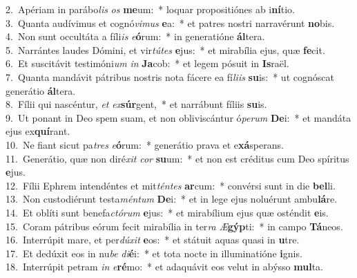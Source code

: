 {2.~}Apériam in parábo\textit{lis} \textit{os} \textbf{me}um:~* loquar propositiónes ab i\textbf{ní}tio.\\
{3.~}Quanta audívimus et cognó\textit{vi}\textit{mus} \textbf{e}a:~* et patres nostri narravérunt \textbf{no}bis.\\
{4.~}Non sunt occultáta a fíli\textit{is} \textit{e}\textbf{ó}rum:~* in generatióne \textbf{ál}tera.\\
{5.~}Narrántes laudes Dómini, et vir\textit{tú}\textit{tes} \textbf{e}jus:~* et mirabília ejus, quæ \textbf{fe}cit.\\
{6.~}Et suscitávit testimóni\textit{um} \textit{in} \textbf{Ja}cob:~* et legem pósuit in \textbf{Is}raël.\\
{7.~}Quanta mandávit pátribus nostris nota fácere ea fí\textit{li}\textit{is} \textbf{su}is:~* ut cognóscat generátio \textbf{ál}tera.\\
{8.~}Fílii qui nascéntur, \textit{et} \textit{ex}\textbf{súr}gent,~* et narrábunt fíliis \textbf{su}is.\\
{9.~}Ut ponant in Deo spem suam, et non obliviscántur ó\textit{pe}\textit{rum} \textbf{De}i:~* et mandáta ejus ex\textbf{quí}rant.\\
{10.~}Ne fiant sicut pa\textit{tres} \textit{e}\textbf{ó}rum:~* generátio prava et e\textbf{xá}sperans.\\
{11.~}Generátio, quæ non diré\textit{xit} \textit{cor} \textbf{su}um:~* et non est créditus cum Deo spíritus \textbf{e}jus.\\
{12.~}Fílii Ephrem intendéntes et mit\textit{tén}\textit{tes} \textbf{ar}cum:~* convérsi sunt in die \textbf{bel}li.\\
{13.~}Non custodiérunt testa\textit{mén}\textit{tum} \textbf{De}i:~* et in lege ejus noluérunt ambu\textbf{lá}re.\\
{14.~}Et oblíti sunt benefa\textit{ctó}\textit{rum} \textbf{e}jus:~* et mirabílium ejus quæ osténdit \textbf{e}is.\\
{15.~}Coram pátribus eórum fecit mirabília in ter\textit{ra} \textit{Æ}\textbf{gýp}ti:~* in campo \textbf{Tá}neos.\\
{16.~}Interrúpit mare, et per\textit{dú}\textit{xit} \textbf{e}os:~* et státuit aquas quasi in \textbf{u}tre.\\
{17.~}Et dedúxit eos in nu\textit{be} \textit{di}\textbf{é}i:~* et tota nocte in illuminatióne \textbf{i}gnis.\\
{18.~}Interrúpit petram \textit{in} \textit{e}\textbf{ré}mo:~* et adaquávit eos velut in abýsso \textbf{mul}ta.\\
